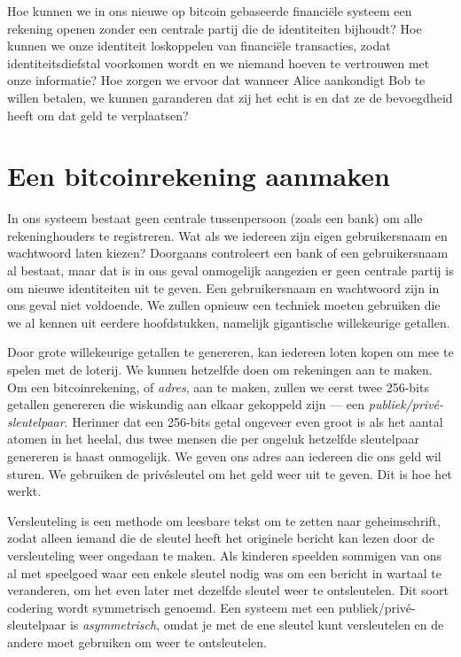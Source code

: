 \documentclass[
  letterpaper,
]{scrbook}
\begin{document}
Hoe kunnen we in ons nieuwe op bitcoin gebaseerde financiële systeem een
rekening openen zonder een centrale partij die de identiteiten bijhoudt?
Hoe kunnen we onze identiteit loskoppelen van financiële transacties,
zodat identiteitsdiefstal voorkomen wordt en we niemand hoeven te
vertrouwen met onze informatie? Hoe zorgen we ervoor dat wanneer Alice
aankondigt Bob te willen betalen, we kunnen garanderen dat zij het echt
is en dat ze de bevoegdheid heeft om dat geld te verplaatsen?

\hypertarget{een-bitcoinrekening-aanmaken}{%
\section{Een bitcoinrekening
aanmaken}\label{een-bitcoinrekening-aanmaken}}

In ons systeem bestaat geen centrale tussenpersoon (zoals een bank) om
alle rekeninghouders te registreren. Wat als we iedereen zijn eigen
gebruikersnaam en wachtwoord laten kiezen? Doorgaans controleert een
bank of een gebruikersnaam al bestaat, maar dat is in ons geval
onmogelijk aangezien er geen centrale partij is om nieuwe identiteiten
uit te geven. Een gebruikersnaam en wachtwoord zijn in ons geval niet
voldoende. We zullen opnieuw een techniek moeten gebruiken die we al
kennen uit eerdere hoofdstukken, namelijk gigantische willekeurige
getallen.

Door grote willekeurige getallen te genereren, kan iedereen loten kopen
om mee te spelen met de loterij. We kunnen hetzelfde doen om rekeningen
aan te maken. Om een bitcoinrekening, of \emph{adres}, aan te maken,
zullen we eerst twee 256-bits getallen genereren die wiskundig aan
elkaar gekoppeld zijn --- een \emph{publiek/privé-sleutelpaar}. Herinner
dat een 256-bits getal ongeveer even groot is als het aantal atomen in
het heelal, dus twee mensen die per ongeluk hetzelfde sleutelpaar
genereren is haast onmogelijk. We geven ons adres aan iedereen die ons
geld wil sturen. We gebruiken de privésleutel om het geld weer uit te
geven. Dit is hoe het werkt.

Versleuteling is een methode om leesbare tekst om te zetten naar
geheimschrift, zodat alleen iemand die de sleutel heeft het originele
bericht kan lezen door de versleuteling weer ongedaan te maken. Als
kinderen speelden sommigen van ons al met speelgoed waar een enkele
sleutel nodig was om een bericht in wartaal te veranderen, om het even
later met dezelfde sleutel weer te ontsleutelen. Dit soort codering
wordt symmetrisch genoemd. Een systeem met een publiek/privé-sleutelpaar
is \emph{asymmetrisch}, omdat je met de ene sleutel kunt versleutelen en
de andere moet gebruiken om weer te ontsleutelen.
\end{document}
